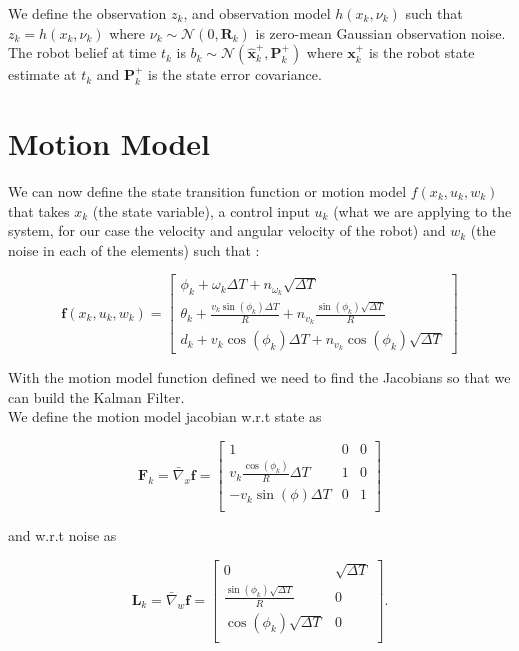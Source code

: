 \documentclass[12pt]{article}
\begin{document}
We define the observation $z_k$, and observation model $h(x_k, \nu_k)$ such that $z_{k} = h(x_k, \nu_k)$ where $\nu_k \sim \mathcal{N}(0, \mathbf{R}_k)$ is zero-mean Gaussian observation noise. The robot belief at time $t_k$ is $b_k \sim \mathcal{N}(\hat{\mathbf{x}}^{+}_k, \mathbf{P}^{+}_k)$ where $\mathbf{x}^{+}_k$ is the robot state estimate at $t_k$ and $\mathbf{P}^{+}_k$ is the state error covariance.

\section{Motion Model}\label{sec:motion-model}

We can now define the state transition function or motion model $f(x_k, u_k,w_k)$ that takes $x_k$ (the state variable), a control input $u_k$ (what we are applying to the system, for our case the velocity and angular velocity of the robot) and $w_k$ (the noise in each of the elements) such that :

\begin{equation}\label{eq:motion-model}
\mathbf{f}(x_k,u_k,w_k) = 
\begin{bmatrix}
 	\phi_k + \omega_k \Delta T + n_{\omega_k} \sqrt{\Delta T} \\
 	\theta_k + \frac{v_k  \sin(\phi_k)\Delta T}{R} + n_{v_k} \frac{\sin(\phi_k)\sqrt{\Delta T}}{R} \\
 	d_k + v_k\cos(\phi_k)\Delta T + n_{v_k} \cos(\phi_k)  \sqrt{\Delta T}
\end{bmatrix}
\end{equation} 

With the motion model function defined we need to find the Jacobians so that we can build the Kalman Filter. \\

We define the motion model jacobian w.r.t state as 

\begin{equation}
	\mathbf{F}_{k} = \bar{\nabla}_x\mathbf{f} = 
	\begin{bmatrix}
		1 & 0 & 0 \\
		v_k \frac{\cos(\phi_k)}{R}\Delta T & 1 & 0 \\
		-v_k\sin(\phi)\Delta T & 0 & 1\\
	\end{bmatrix}
\end{equation} 

and w.r.t noise as 

\begin{equation}
\mathbf{L}_{k} = \bar{\nabla}_w\mathbf{f} = 
\begin{bmatrix}
	0 & \sqrt{\Delta T} \\
	\frac{\sin(\phi_k) \sqrt{\Delta T}}{R} & 0 \\
	\cos(\phi_k)\sqrt{\Delta T} & 0 \\
\end{bmatrix}.	 
\end{equation} 
\end{document}

